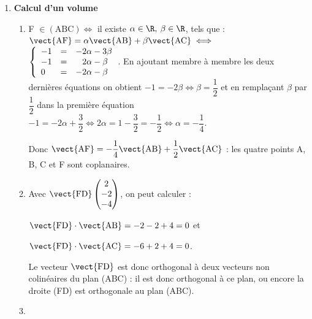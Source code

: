 \begin{enumerate}
\begin{enumerate}
	Comme AC = $\text{BC} = \sqrt{11}$, le triangle ABC est isocèle en C ; or on a vu que E est le projeté de C sur la droite (AB), donc dans le triangle isocèle (ABC), [CE] est la hauteur relative à la base [AB].
	
On a $\vect{\text{CE}}\begin{pmatrix}2\\2\\0\end{pmatrix}$, d'où CE$^2 = 1 + 4 = 8$ et CE $ = 2\sqrt{2}$.

 L'aire du triangle (ABC) est donc égale à :
	
$\mathcal{A}(\text{ABC}) = \dfrac{\text{AB} \times \text{CE}}{2} = \dfrac{2\sqrt{3} \times 2\sqrt{2}}{2} = 2 \sqrt{6}$.
		
	\end{enumerate}
\item \textbf{Calcul d'un volume}
	\begin{enumerate}
		\item 
F $\in (\text{ABC}) \iff $ il existe $\alpha \in \R, \: \beta \in \R$, tels que :
$\vect{\text{AF}} = \alpha \vect{\text{AB}} + \beta\vect{\text{AC}} \iff$\\

$  \left\{\begin{array}{l c l}
- 1 &=&- 2\alpha -3 \beta\\
- 1&=&\phantom{-}2\alpha - \beta\\
0 &=&- 2\alpha - \beta 
\end{array}\right.$. En ajoutant membre à membre les deux dernières équations on obtient $- 1 = - 2\beta \iff \beta =  \dfrac12$ et en remplaçant $\beta$ par $ \dfrac12$ dans la première équation $- 1 = - 2\alpha + \dfrac32 \iff 2\alpha = 1  - \dfrac32 = - \dfrac12 \iff \alpha = - \dfrac14$.

Donc $\vect{\text{AF}} = - \dfrac14 \vect{\text{AB}} + \dfrac12\vect{\text{AC}}$ : les quatre points A, B, C et F sont coplanaires.
		\item 
Avec $\vect{\text{FD}}\begin{pmatrix}2\\-2\\-4\end{pmatrix}$, on peut calculer :
		
$\vect{\text{FD}}\cdot \vect{\text{AB}} = - 2 - 2 + 4 = 0$ et 

$\vect{\text{FD}}\cdot \vect{\text{AC}} = - 6 + 2 + 4 = 0$.

Le vecteur $\vect{\text{FD}}$ est donc orthogonal à deux vecteurs non colinéaires du plan (ABC) : il est donc orthogonal à ce plan, ou encore la droite (FD) est orthogonale au plan (ABC).
		\item 


\end{enumerate}
\end{enumerate}

